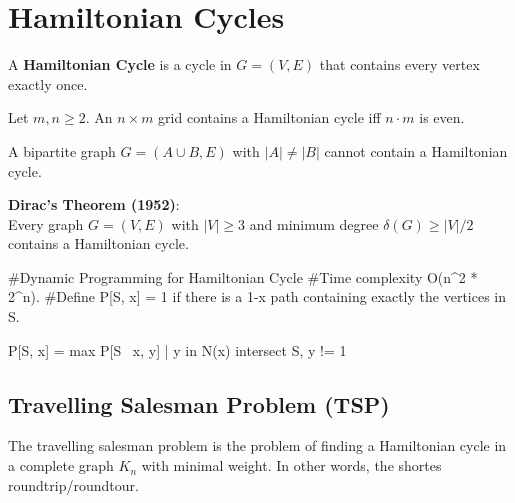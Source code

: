\section{Hamiltonian Cycles}

\begin{definition}

    A \textbf{Hamiltonian Cycle} is a cycle in $G = (V, E)$ that contains every vertex exactly once.
    
\end{definition}

\begin{theorem}

    Let $m, n \ge 2$. An $n \times m$ grid contains a Hamiltonian cycle iff $n \cdot m$ is even.
    
\end{theorem}

\begin{theorem}

    A bipartite graph $G = (A \cup B, E)$ with $|A| \neq |B|$ cannot contain a Hamiltonian cycle.
    
\end{theorem}

\begin{theorem}

\textbf{Dirac's Theorem (1952)}:\\

    Every graph $G = (V, E)$ with $|V| \ge 3$ and minimum degree $\delta(G) \ge |V|/2$ contains a
    Hamiltonian cycle.
    
\end{theorem}

\begin{algorithm}

#Dynamic Programming for Hamiltonian Cycle
#Time complexity O(n^2 * 2^n).
#Define P[S, x] = 1 if there is a 1-x path containing exactly the vertices in S.

P[S, x] = max { P[S \ {x}, y] | y in N(x) intersect S, y != 1 }
    
\end{algorithm}

\subsection{Travelling Salesman Problem (TSP)}

    The travelling salesman problem is the problem of finding a Hamiltonian cycle in a complete graph $K_n$ with
    minimal weight. In other words, the shortes roundtrip/roundtour.

